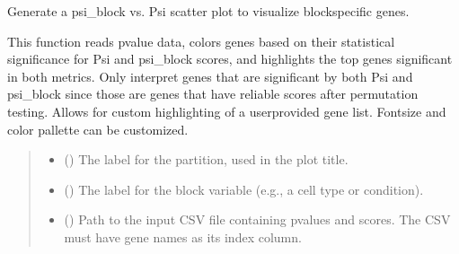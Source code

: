 \documentclass[letterpaper,10pt,english]{sphinxmanual}
\begin{document}
\begin{fulllineitems}
\label{\detokenize{ember_py:ember_py.plots.plot_block_specificity}}
\pysigstartsignatures
\pysiglinewithargsret
{}
{\sphinxparamcomma {}\sphinxparamcomma {}\sphinxparamcomma {}\sphinxparamcomma {}\sphinxparamcomma {}\sphinxparamcomma {}\sphinxparamcomma {}}
{}
\pysigstopsignatures
\sphinxAtStartPar
Generate a psi\_block vs. Psi scatter plot to visualize block\sphinxhyphen{}specific genes.

\sphinxAtStartPar
This function reads p\sphinxhyphen{}value data, colors genes based on their statistical
significance for Psi and psi\_block scores, and highlights the top genes
significant in both metrics. Only interpret genes that are significant by both Psi
and psi\_block since those are genes that have reliable scores after permutation
testing.
Allows for custom highlighting of a user\sphinxhyphen{}provided gene list.
Fontsize and color pallette can be customized.
\begin{quote}\begin{description}
\begin{itemize}
\item {} 
\sphinxAtStartPar
{} (\sphinxstyleliteralemphasis{\sphinxupquote{, }}) \textendash{} The label for the partition, used in the plot title.

\item {} 
\sphinxAtStartPar
{} (\sphinxstyleliteralemphasis{\sphinxupquote{, }}) \textendash{} The label for the block variable (e.g., a cell type or condition).

\item {} 
\sphinxAtStartPar
{} (\sphinxstyleliteralemphasis{\sphinxupquote{, }}) \textendash{} Path to the input CSV file containing p\sphinxhyphen{}values and scores.
The CSV must have gene names as its index column.


\end{itemize}
\end{description}
\end{quote}
\end{fulllineitems}
\end{document}
